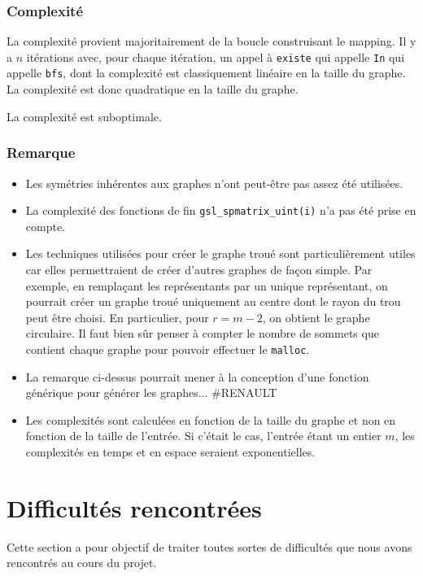 \subsubsection*{Complexité}
La complexité provient majoritairement de la boucle construisant le mapping. Il y a $n$ itérations avec, pour chaque itération, un appel à \texttt{existe} qui appelle \texttt{In} qui appelle \texttt{bfs}, dont la complexité est classiquement linéaire en la taille du graphe. La complexité est donc quadratique en la taille du graphe.

La complexité est suboptimale.

\subsubsection*{Remarque}
\begin{itemize}
    \item Les symétries inhérentes aux graphes n'ont peut-être pas assez été utilisées.
    \item La complexité des fonctions de fin \texttt{gsl\_spmatrix\_uint(i)} n'a pas été prise en compte.
    \item Les techniques utilisées pour créer le graphe troué sont particulièrement utiles car elles permettraient de créer d'autres graphes de façon simple. Par exemple, en remplaçant les représentants par un unique représentant, on pourrait créer un graphe troué uniquement au centre dont le rayon du trou peut être choisi. En particulier, pour $r = m - 2$, on obtient le graphe circulaire. Il faut bien sûr penser à compter le nombre de sommets que contient chaque graphe pour pouvoir effectuer le \texttt{malloc}.
    \item La remarque ci-dessus pourrait mener à la conception d'une fonction générique pour générer les graphes... \#RENAULT
    \item Les complexités sont calculées en fonction de la taille du graphe et non en fonction de la taille de l'entrée. Si c'était le cas, l'entrée étant un entier $m$, les complexités en temps et en espace seraient exponentielles.
\end{itemize}



\section{Difficultés rencontrées}
Cette section a pour objectif de traiter toutes sortes de difficultés que nous avons rencontrés au cours du projet.

